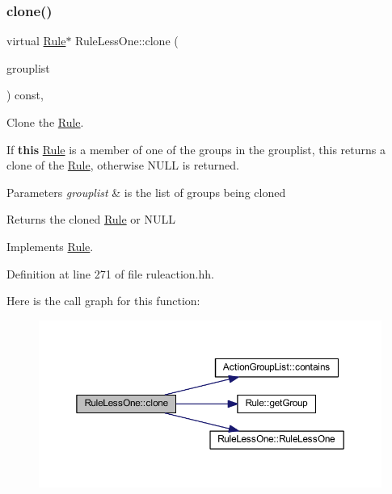 \subsubsection{\texorpdfstring{clone()}{clone()}}
{\footnotesize\ttfamily virtual \mbox{\hyperlink{class_rule}{Rule}}$\ast$ Rule\+Less\+One\+::clone (\begin{DoxyParamCaption}\item[{const \mbox{\hyperlink{class_action_group_list}{Action\+Group\+List}} \&}]{grouplist }\end{DoxyParamCaption}) const\hspace{0.3cm}{\ttfamily [inline]}, {\ttfamily [virtual]}}



Clone the \mbox{\hyperlink{class_rule}{Rule}}. 

If {\bfseries{this}} \mbox{\hyperlink{class_rule}{Rule}} is a member of one of the groups in the grouplist, this returns a clone of the \mbox{\hyperlink{class_rule}{Rule}}, otherwise N\+U\+LL is returned. 
\begin{DoxyParams}{Parameters}
{\em grouplist} & is the list of groups being cloned \\
\hline
\end{DoxyParams}
\begin{DoxyReturn}{Returns}
the cloned \mbox{\hyperlink{class_rule}{Rule}} or N\+U\+LL 
\end{DoxyReturn}


Implements \mbox{\hyperlink{class_rule_a70de90a76461bfa7ea0b575ce3c11e4d}{Rule}}.



Definition at line 271 of file ruleaction.\+hh.

Here is the call graph for this function\+:
\nopagebreak
\begin{figure}[H]
\begin{center}
\leavevmode
\includegraphics[width=350pt]{class_rule_less_one_aa048e872f55a1c8034660279f58f8e5b_cgraph}
\end{center}
\end{figure}
\mbox{\label{class_rule_less_one_a5750d5201b5022d8cb8caf71a4fa85d3}} 
